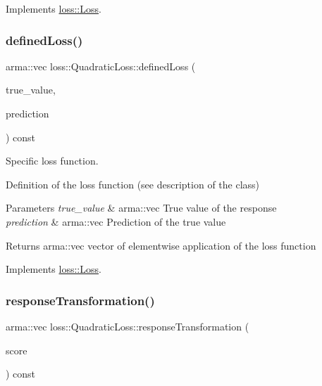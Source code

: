 Implements \hyperlink{classloss_1_1_loss_a267a4de70747ade4b2d84ce35a448979}{loss\+::\+Loss}.

\mbox{\label{classloss_1_1_quadratic_loss_ae34f68243ffe021e309ed73a68796e1e}} 
\subsubsection{\texorpdfstring{defined\+Loss()}{definedLoss()}}
{\footnotesize\ttfamily arma\+::vec loss\+::\+Quadratic\+Loss\+::defined\+Loss (\begin{DoxyParamCaption}\item[{const arma\+::vec \&}]{true\+\_\+value,  }\item[{const arma\+::vec \&}]{prediction }\end{DoxyParamCaption}) const\hspace{0.3cm}{\ttfamily [virtual]}}



Specific loss function. 

Definition of the loss function (see description of the class)


\begin{DoxyParams}{Parameters}
{\em true\+\_\+value} & {\ttfamily arma\+::vec} True value of the response \\
\hline
{\em prediction} & {\ttfamily arma\+::vec} Prediction of the true value\\
\hline
\end{DoxyParams}
\begin{DoxyReturn}{Returns}
{\ttfamily arma\+::vec} vector of elementwise application of the loss function 
\end{DoxyReturn}


Implements \hyperlink{classloss_1_1_loss_ae9f94dd9b8311397583ba3a9cb485e94}{loss\+::\+Loss}.

\mbox{\label{classloss_1_1_quadratic_loss_a0a7f1ed4a208326bed1ba5f1bb4d37e5}} 
\subsubsection{\texorpdfstring{response\+Transformation()}{responseTransformation()}}
{\footnotesize\ttfamily arma\+::vec loss\+::\+Quadratic\+Loss\+::response\+Transformation (\begin{DoxyParamCaption}\item[{const arma\+::vec \&}]{score }\end{DoxyParamCaption}) const\hspace{0.3cm}{\ttfamily [virtual]}}



